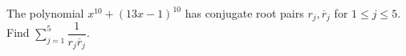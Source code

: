 The polynomial $x^{10}+(13x-1)^{10}$ has conjugate root pairs $r_j,\overline r_j$ for $1\le j\le 5$. Find $\sum_{j=1}^5\dfrac{1}{r_j\overline r_j}$.
